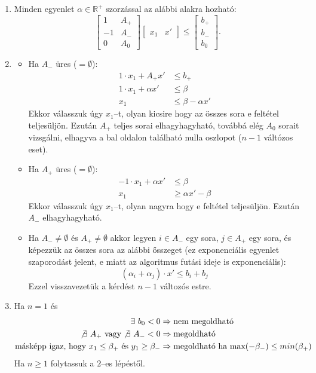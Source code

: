 \begin{enumerate}
  \item Minden egyenlet $\alpha \in \mathbb{R}^+$ szorzással az alábbi alakra hozható:
  \begin{displaymath}
  \begin{bmatrix}
  1  & A_+ \\
  -1 & A_- \\
  0  & A_0
  \end{bmatrix}
  \begin{bmatrix}
  x_1 & 
  x'
  \end{bmatrix}
  \leq
  \begin{bmatrix}
  b_+ \\
  b_- \\
  b_0
  \end{bmatrix}.
  \end{displaymath}
  \item 
  \begin{itemize}
  	\item Ha $A_-$ üres ($=\emptyset$): 
  	\begin{align*}
  	1 \cdot x_1 + A_+ x'     &\leq b_+ \\
  	1 \cdot x_1 + \alpha x' &\leq \beta \\
  	x_1 			  &\leq \beta - \alpha x' 
  	\end{align*} 
    Ekkor válasszuk úgy $x_1$--t, olyan kicsire hogy az összes sora e feltétel
    teljesüljön. Ezután $A_+$ teljes sorai elhagyhagyható, továbbá elég $A_0$
    sorait vizsgálni, elhagyva a bal oldalon található nulla oszlopot ($n-1$
    váltózos eset).
  	
  	\item Ha $A_+$ üres ($=\emptyset$): 
  	\begin{align*}
  	-1 \cdot x_1 + \alpha x'     &\leq \beta \\
  	x_1 			  &\geq \alpha x' - \beta 
  	\end{align*} 
  	Ekkor válasszuk úgy $x_1$--t, olyan nagyra hogy e feltétel teljesüljön.
  	Ezután $A_-$ elhagyhagyható.
  	\item Ha $A_- \neq \emptyset$ és $A_+ \neq \emptyset$ akkor legyen 
  	$i \in A_-$ egy sora, $j \in A_+$ egy sora, és képezzük az összes sora az
  	alábbi ősszeget (ez exponenciális egyenlet szaporodást jelent, e miatt az algoritmus
  	futási ideje is exponenciális):
  	\[
  	\left( \alpha_i + \alpha_j \right) \cdot x' \leq b_i + b_j 
  	\]
  	Ezzel visszavezetük a kérdést $n-1$ változós estre.
  \end{itemize}
 \item Ha $n=1$ és 
 \begin{align*}
 \exists~b_0 < 0 &\Rightarrow \mbox{nem megoldható} \\
 \not \exists~A_+ \mbox{ vagy} \not \exists~A_- < 0 &\Rightarrow \mbox{megoldható} \\
 \mbox{másképp igaz, hogy } x_1 \leq \beta_+ \mbox{ és } y_1 \geq \beta_-
 &\Rightarrow \mbox{megoldható ha } \mbox{max}(-\beta_-) \leq min(\beta_+)
 \end{align*} 
  Ha $n \geq 1$ folytassuk a $2$--es lépéstől.
\end{enumerate} 